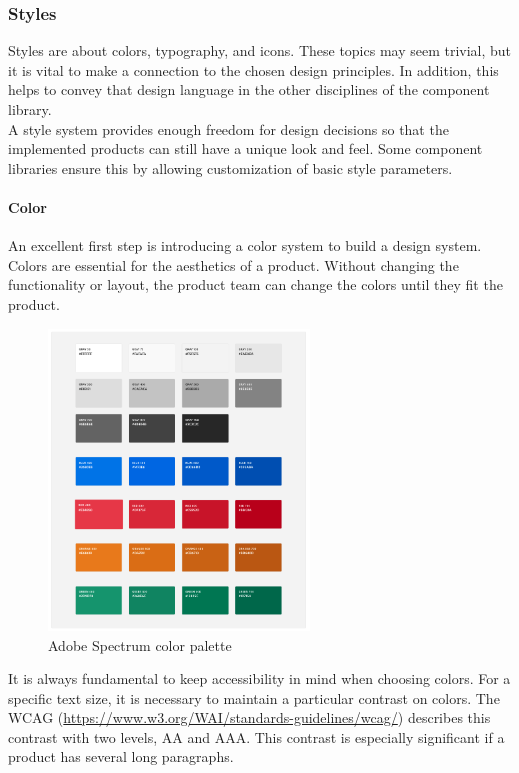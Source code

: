 \subsubsection{Styles}
Styles are about colors, typography, and icons. These topics may seem trivial, but it is vital to make a connection to the chosen design principles. In addition, this helps to convey that design language in the other disciplines of the component library. \\
A style system provides enough freedom for design decisions so that the implemented products can still have a unique look and feel. Some component libraries ensure this by allowing customization of basic style parameters.\cite{vesselov_building_2019}

\paragraph{Color}
An excellent first step is introducing a color system to build a design system. Colors are essential for the aesthetics of a product.
Without changing the functionality or layout, the product team can change the colors until they fit the product. \\
\begin{figure}[htbp]
	\centerline{\includegraphics[height=8cm]{images/adobe_spectrum_color_palette.png}}
	\caption{Adobe Spectrum color palette \cite{spectrum_adobe_spectrum_nodate}}
	\label{adobe_spectrum_colors}
\end{figure}
It is always fundamental to keep accessibility in mind when choosing colors. For a specific text size, it is necessary to maintain a particular contrast on colors. The WCAG (\url{https://www.w3.org/WAI/standards-guidelines/wcag/}) describes this contrast with two levels, AA and AAA. This contrast is especially significant if a product has several long paragraphs.  \\
